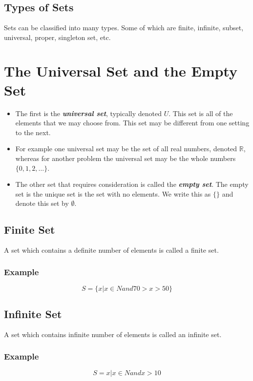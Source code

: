 \documentclass[12pt]{article}
\begin{document}
\subsection{Types of Sets}
Sets can be classified into many types. Some of which are finite, infinite, subset, universal, proper, singleton set, etc.
\section*{The Universal Set and the Empty Set}
\begin{itemize}
	\item The first is the \textbf{\textit{universal set}}, typically denoted $U$. This set is all of the elements that we may choose from. This set may be different from one setting to the next. 
	
	\item For example one universal set may be the set of all real numbers, denoted $\mathbb{R}$, whereas for another problem the universal set may be the whole numbers $\{0, 1, 2,\ldots\}$.
	
	\item The other set that requires consideration is called the \textit{\textbf{empty set}}. The empty set is the unique set is the set with no elements. We write this as $\{ \}$ and denote this set by $\emptyset$.
\end{itemize}



\subsection{Finite Set}
A set which contains a definite number of elements is called a finite set.

\subsubsection{Example} \[S=\{x|x \in N and 70 >x>50\}\]
\subsection{Infinite Set}
A set which contains infinite number of elements is called an infinite set.

\subsubsection{Example} \[S={x|x\in N  and x>10}\]
\end{document}
